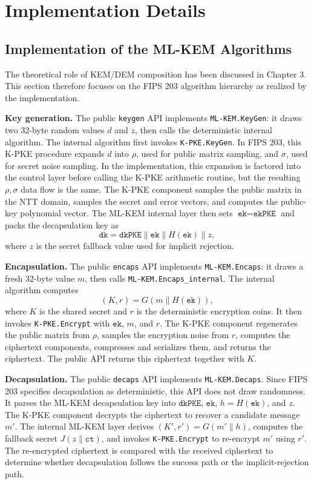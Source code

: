 \section{Implementation Details}

\subsection{Implementation of the ML-KEM Algorithms}

The theoretical role of KEM/DEM composition has been discussed in Chapter 3. This section therefore focuses on the FIPS 203 algorithm hierarchy as realized by the implementation.

\textbf{Key generation.} The public \texttt{keygen} API implements \texttt{ML-KEM.KeyGen}: it draws two 32-byte random values $d$ and $z$, then calls the deterministic internal algorithm. The internal algorithm first invokes \texttt{K-PKE.KeyGen}. In FIPS 203, this K-PKE procedure expands $d$ into $\rho$, used for public matrix sampling, and $\sigma$, used for secret noise sampling. In the implementation, this expansion is factored into the control layer before calling the K-PKE arithmetic routine, but the resulting $\rho,\sigma$ data flow is the same. The K-PKE component samples the public matrix in the NTT domain, samples the secret and error vectors, and computes the public-key polynomial vector. The ML-KEM internal layer then sets $\texttt{ek}=\texttt{ekPKE}$ and packs the decapsulation key as
$$
\texttt{dk} = \texttt{dkPKE} \parallel \texttt{ek} \parallel H(\texttt{ek}) \parallel z ,
$$
where $z$ is the secret fallback value used for implicit rejection.

\textbf{Encapsulation.} The public \texttt{encaps} API implements \texttt{ML-KEM.Encaps}: it draws a fresh 32-byte value $m$, then calls \texttt{ML-KEM.Encaps\_internal}. The internal algorithm computes
$$
(K, r) = G(m \parallel H(\texttt{ek})),
$$
where $K$ is the shared secret and $r$ is the deterministic encryption coins. It then invokes \texttt{K-PKE.Encrypt} with $\texttt{ek}$, $m$, and $r$. The K-PKE component regenerates the public matrix from $\rho$, samples the encryption noise from $r$, computes the ciphertext components, compresses and serializes them, and returns the ciphertext. The public API returns this ciphertext together with $K$.

\textbf{Decapsulation.} The public \texttt{decaps} API implements \texttt{ML-KEM.Decaps}. Since FIPS 203 specifies decapsulation as deterministic, this API does not draw randomness. It parses the ML-KEM decapsulation key into $\texttt{dkPKE}$, $\texttt{ek}$, $h=H(\texttt{ek})$, and $z$. The K-PKE component decrypts the ciphertext to recover a candidate message $m'$. The internal ML-KEM layer derives $(K',r')=G(m'\parallel h)$, computes the fallback secret $J(z\parallel\texttt{ct})$, and invokes \texttt{K-PKE.Encrypt} to re-encrypt $m'$ using $r'$. The re-encrypted ciphertext is compared with the received ciphertext to determine whether decapsulation follows the success path or the implicit-rejection path.


